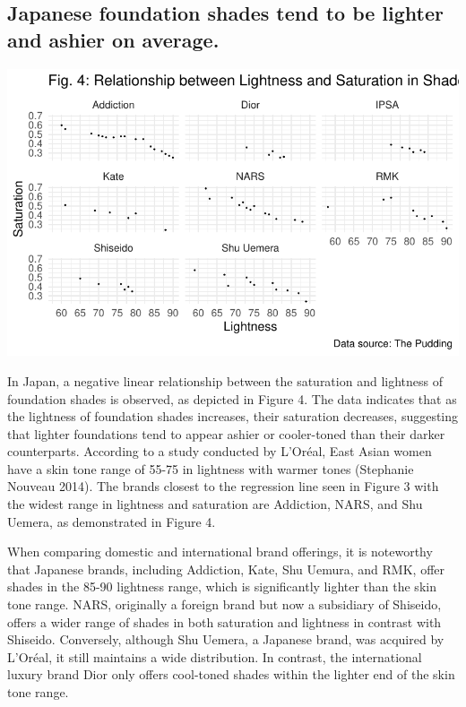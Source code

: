 \documentclass[
  letterpaper,
  DIV=11,
  numbers=noendperiod]{scrartcl}
\begin{document}
\hypertarget{japanese-foundation-shades-tend-to-be-lighter-and-ashier-on-average.}{%
\subsection{Japanese foundation shades tend to be lighter and ashier on
average.}\label{japanese-foundation-shades-tend-to-be-lighter-and-ashier-on-average.}}

\includegraphics{paper_files/figure-pdf/unnamed-chunk-7-1.pdf}

In Japan, a negative linear relationship between the saturation and
lightness of foundation shades is observed, as depicted in Figure 4. The
data indicates that as the lightness of foundation shades increases,
their saturation decreases, suggesting that lighter foundations tend to
appear ashier or cooler-toned than their darker counterparts. According
to a study conducted by L'Oréal, East Asian women have a skin tone range
of 55-75 in lightness with warmer tones (Stephanie Nouveau 2014). The
brands closest to the regression line seen in Figure 3 with the widest
range in lightness and saturation are Addiction, NARS, and Shu Uemera,
as demonstrated in Figure 4.

When comparing domestic and international brand offerings, it is
noteworthy that Japanese brands, including Addiction, Kate, Shu Uemura,
and RMK, offer shades in the 85-90 lightness range, which is
significantly lighter than the skin tone range. NARS, originally a
foreign brand but now a subsidiary of Shiseido, offers a wider range of
shades in both saturation and lightness in contrast with Shiseido.
Conversely, although Shu Uemera, a Japanese brand, was acquired by
L'Oréal, it still maintains a wide distribution. In contrast, the
international luxury brand Dior only offers cool-toned shades within the
lighter end of the skin tone range.
\end{document}
